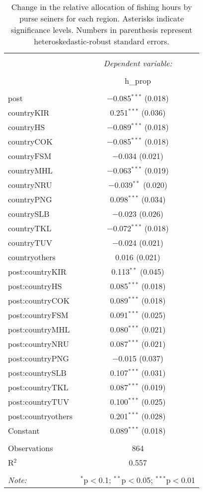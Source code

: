 \documentclass[12pt,]{article}
\begin{document}
\begin{table}[!htbp] \centering 
  \caption{\label{tab:disp_mod}Change in the relative allocation of fishing hours by purse seiners for each region. Asterisks indicate significance levels. Numbers in parenthesis represent heteroskedastic-robust standard errors.} 
  \label{} 
\begin{tabular}{@{\extracolsep{5pt}}lc} 
\\[-1.8ex]\hline 
\hline \\[-1.8ex] 
 & \multicolumn{1}{c}{\textit{Dependent variable:}} \\ 
\cline{2-2} 
\\[-1.8ex] & h\_prop \\ 
\hline \\[-1.8ex] 
 post & $-$0.085$^{***}$ (0.018) \\ 
  countryKIR & 0.251$^{***}$ (0.036) \\ 
  countryHS & $-$0.089$^{***}$ (0.018) \\ 
  countryCOK & $-$0.085$^{***}$ (0.018) \\ 
  countryFSM & $-$0.034 (0.021) \\ 
  countryMHL & $-$0.063$^{***}$ (0.019) \\ 
  countryNRU & $-$0.039$^{**}$ (0.020) \\ 
  countryPNG & 0.098$^{***}$ (0.034) \\ 
  countrySLB & $-$0.023 (0.026) \\ 
  countryTKL & $-$0.072$^{***}$ (0.018) \\ 
  countryTUV & $-$0.024 (0.021) \\ 
  countryothers & 0.016 (0.021) \\ 
  post:countryKIR & 0.113$^{**}$ (0.045) \\ 
  post:countryHS & 0.085$^{***}$ (0.018) \\ 
  post:countryCOK & 0.089$^{***}$ (0.018) \\ 
  post:countryFSM & 0.091$^{***}$ (0.025) \\ 
  post:countryMHL & 0.080$^{***}$ (0.021) \\ 
  post:countryNRU & 0.087$^{***}$ (0.021) \\ 
  post:countryPNG & $-$0.015 (0.037) \\ 
  post:countrySLB & 0.107$^{***}$ (0.031) \\ 
  post:countryTKL & 0.087$^{***}$ (0.019) \\ 
  post:countryTUV & 0.100$^{***}$ (0.025) \\ 
  post:countryothers & 0.201$^{***}$ (0.028) \\ 
  Constant & 0.089$^{***}$ (0.018) \\ 
 \hline \\[-1.8ex] 
Observations & 864 \\ 
R$^{2}$ & 0.557 \\ 
\hline 
\hline \\[-1.8ex] 
\textit{Note:}  & \multicolumn{1}{r}{$^{*}$p$<$0.1; $^{**}$p$<$0.05; $^{***}$p$<$0.01} \\ 
\end{tabular} 
\end{table}
\end{document}
